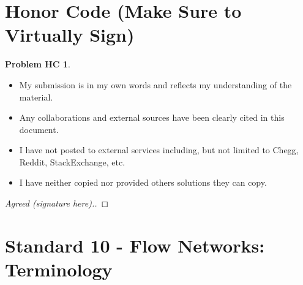 \documentclass[11pt]{article}
\theoremstyle{definition}
\theoremstyle{definition}
\newtheorem*{requiredHC}{Problem HC}
\theoremstyle{definition}
\begin{document}
\section*{Honor Code (Make Sure to Virtually Sign)} \label{HonorCode}
\hypertarget{HonorCode}{}

\begin{requiredHC}
\begin{itemize}
\item My submission is in my own words and reflects my understanding of the material.
\item Any collaborations and external sources have been clearly cited in this document.
\item I have not posted to external services including, but not limited to Chegg, Reddit, StackExchange, etc.
\item I have neither copied nor provided others solutions they can copy.
\end{itemize}

\end{requiredHC}

\begin{proof}[Agreed (signature here).]
\end{proof}


\newpage
\setcounter{section}{9}
\section{Standard 10 - Flow Networks: Terminology}
\end{document}
